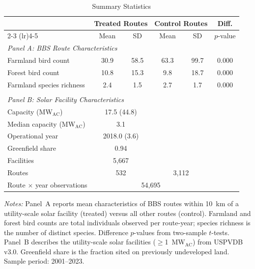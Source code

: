 \begin{table}[t]
\centering
\begin{threeparttable}
\caption{Summary Statistics}
\label{tab:summary}
\footnotesize
\begin{tabular}{lccccc}
\toprule
 & \multicolumn{2}{c}{Treated Routes} & \multicolumn{2}{c}{Control Routes} & Diff. \\
\cmidrule(lr){2-3} \cmidrule(lr){4-5}
 & Mean & SD & Mean & SD & $p$-value \\
\midrule
\multicolumn{6}{l}{\textit{Panel A: BBS Route Characteristics}} \\
Farmland bird count & 30.9 & 58.5 & 63.3 & 99.7 & 0.000 \\
Forest bird count & 10.8 & 15.3 & 9.8 & 18.7 & 0.000 \\
Farmland species richness & 2.4 & 1.5 & 2.7 & 1.7 & 0.000 \\
\\[4pt]
\multicolumn{6}{l}{\textit{Panel B: Solar Facility Characteristics}} \\
Capacity (MW$_{\text{AC}}$) & \multicolumn{2}{c}{17.5 (44.8)} & & & \\
Median capacity (MW$_{\text{AC}}$) & \multicolumn{2}{c}{3.1} & & & \\
Operational year & \multicolumn{2}{c}{2018.0 (3.6)} & & & \\
Greenfield share & \multicolumn{2}{c}{0.94} & & & \\
Facilities & \multicolumn{2}{c}{5,667} & & & \\
\midrule
Routes & \multicolumn{2}{c}{532} & \multicolumn{2}{c}{3,112} & \\
Route $\times$ year observations & \multicolumn{4}{c}{54,695} & \\
\bottomrule
\end{tabular}
\begin{tablenotes}[flushleft]\small
\item \textit{Notes:} Panel~A reports mean characteristics of BBS routes within 10~km of a utility-scale solar facility (treated) versus all other routes (control). Farmland and forest bird counts are total individuals observed per route-year; species richness is the number of distinct species. Difference $p$-values from two-sample $t$-tests. Panel~B describes the utility-scale solar facilities ($\geq$1~MW$_{\text{AC}}$) from USPVDB v3.0. Greenfield share is the fraction sited on previously undeveloped land. Sample period: 2001--2023.
\end{tablenotes}
\end{threeparttable}
\end{table}

